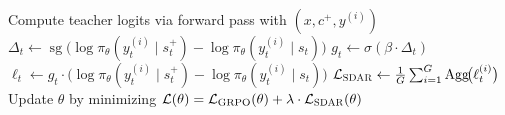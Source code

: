 \begin{algorithm}[h]
\begin{algorithmic}[1]
          \State {}                             
              \State Compute teacher logits via forward pass with $(x, c^{+}, y^{(i)})$         
                  \State $\Delta_t \gets \operatorname{sg}\!\bigl(\log\pi_{\theta}(y_t^{(i)}    
  \mid s_t^{+}) - \log\pi_{\theta}(y_t^{(i)} \mid s_t)\bigr)$           
                  \State $g_t \gets \sigma(\beta \cdot \Delta_t)$                                                          
                  \State $\ell_t \gets g_t \cdot \bigl(\log\pi_{\theta}(y_t^{(i)} \mid s_t^{+})
  - \log\pi_{\theta}(y_t^{(i)} \mid s_t)\bigr)$                                                 
              \EndFor
          \EndFor                                                                               
          \State $\mathcal{L}_{\textsc{SDAR}} \gets                                               
  \frac{1}{G}\sum_{i=1}^{G}\operatorname{Agg}\!\bigl(\ell_t^{(i)}\bigr)$                        
          \State {}                                        
          \State Update $\theta$ by minimizing $\mathcal{L}(\theta) =                           
  \mathcal{L}_{\mathrm{GRPO}}(\theta) + \lambda \cdot \mathcal{L}_{\textsc{SDAR}}(\theta)$        
      \EndFor                                                                                   
  \EndFor                                                                                       
  \end{algorithmic}
  \end{algorithm}

